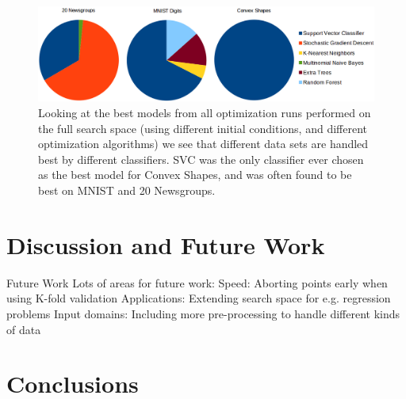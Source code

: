 \documentclass[wcp]{jmlr}
\begin{document}
\begin{figure}
    \centering
    \includegraphics[width=\textwidth]{graphics/pie}
    \caption{Looking at the best models from all optimization runs performed on the full search space (using different initial conditions, and different optimization algorithms)
             we see that different data sets are handled best by different classifiers.
             SVC was the only classifier ever chosen as the best model for Convex Shapes, and was often found to be best on MNIST and 20 Newsgroups.
         }
    \label{fig:npie}
\end{figure}



\section{Discussion and Future Work}
Future Work
Lots of areas for future work:
Speed: Aborting points early when using K-fold validation
Applications: Extending search space for e.g. regression problems
Input domains: Including more pre-processing to handle different kinds of data


\section{Conclusions}




\end{document}
